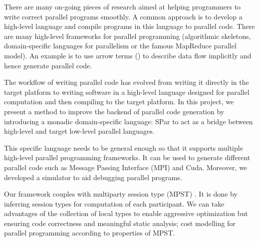There are many on-going pieces of research aimed at helping programmers to write correct parallel programs smoothly. A common approach is to develop a high-level language and compile programs in this language to parallel code. There are many high-level frameworks for parallel programming (\eg algorithmic skeletons\cite{coleAlgorithmicSkeletonsStructured}, domain-specific languages for parallelism\cite{brownHeterogeneousParallelFramework2011} or the famous MapReduce parallel model\cite{liMapReduceParallelProgramming2016}). An example \cite{braunArrowsParallelComputation2018} is to use arrow terms () to describe data flow implicitly and hence generate parallel code.

The workflow of writing parallel code has evolved from writing it directly in the target platform to writing software in a high-level language designed for parallel computation and then compiling to the target platform. In this project, we present a method to improve the backend of parallel code generation by introducing a monadic domain-specific language: SPar to act as a bridge between high-level and target low-level parallel languages.

This specific language needs to be general enough so that it supports multiple high-level parallel programming frameworks. It can be used to generate different parallel code such as Message Passing Interface (MPI) and Cuda. Moreover, we developed a simulator to aid debugging parallel programs.


Our framework couples with multiparty session type (MPST) \cite{coppoGentleIntroductionMultiparty2015}. It is done by inferring session types for computation of each participant. We can take advantages of the collection of local types to enable aggressive optimization but ensuring code correctness and meaningful static analysis; \eg cost modelling for parallel programming according to properties of MPST.
